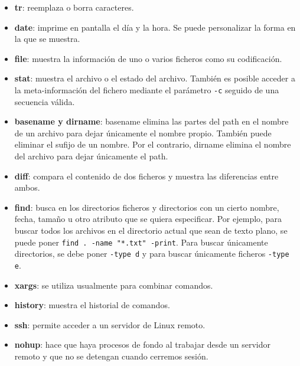 \begin{itemize}
\item \textbf{tr}: reemplaza o borra caracteres.

\item \textbf{date}: imprime en pantalla el día y la hora. Se puede personalizar la forma en la que se muestra. 

\item \textbf{file}: muestra la información de uno o varios ficheros como su codificación.

\item \textbf{stat}: muestra el archivo o el estado del archivo. También es posible acceder a la meta-información del fichero mediante el parámetro \texttt{-c} seguido de una secuencia válida. 

\item \textbf{basename y dirname}: basename elimina las partes del path en el nombre de un archivo para dejar únicamente el nombre propio. También puede eliminar el sufijo de un nombre. Por el contrario, dirname elimina el nombre del archivo para dejar únicamente el path.

\item \textbf{diff}: compara el contenido de dos ficheros y muestra las diferencias entre ambos.

\item \textbf{find}: busca en los directorios ficheros y directorios con un cierto nombre, fecha, tamaño u otro atributo que se quiera especificar. Por ejemplo, para buscar todos los archivos en el directorio actual que sean de texto plano, se puede poner \texttt{find . -name "*.txt" -print}. Para buscar únicamente directorios, se debe poner \texttt{-type d} y para buscar únicamente ficheros \texttt{-type e}.

\item \textbf{xargs}: se utiliza usualmente para combinar comandos.

\item \textbf{history}: muestra el historial de comandos.

\item \textbf{ssh}: permite acceder a un servidor de Linux remoto.

\item \textbf{nohup}: hace que haya procesos de fondo al trabajar desde un servidor remoto y que no se detengan cuando cerremos sesión.
\end{itemize}
